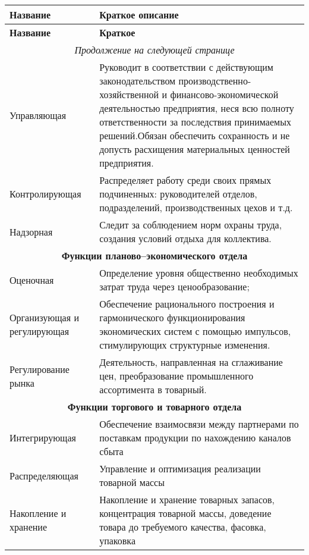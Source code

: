 \documentclass[a4paper,14pt]{extarticle}
\begin{document}
\begin{longtable}[h!]{|p{0.3\linewidth}|p{0.7\linewidth}|}
	\hline
	\textbf{Название} & \textbf{Краткое описание} \\
	\hline
	\endfirsthead
	\hline
	\textbf{Название} & \textbf{Краткое} \\
	\hline \endhead
	\hline
	\multicolumn{2}{c}{\textit{Продолжение на следующей странице}}
	\endfoot
	\hline \endlastfoot
	\hline
	\multicolumn{2}{|c|}{\textbf{Функции директора оптового предприятия}} \\ \hline
	Управляющая & Руководит в соответствии с действующим законодательством производственно-хозяйственной и финансово-экономической деятельностью предприятия, неся всю полноту ответственности за последствия принимаемых решений.Обязан обеспечить сохранность и не допусть расхищения материальных ценностей предприятия. \\ \hline
	Контролирующая & Распределяет работу среди своих прямых подчиненных: руководителей отделов, подразделений, производственных цехов и т.д.\\ \hline
	Надзорная & Следит за соблюдением норм охраны труда, создания условий отдыха для коллектива.\\ \hline
	
	\multicolumn{2}{|c|}{\textbf{Функции планово--экономического отдела}} \\ \hline
	Оценочная     & Определение уровня общественно необходимых затрат труда
	через ценообразование;\\ \hline
	Организующая и
	регулирующая  & Обеспечение рационального построения и гармонического функционирования
	экономических систем с помощью
	импульсов, стимулирующих структурные изменения.\\ \hline
	{Регулирование рынка} & Деятельность, направленная на сглаживание цен,
	преобразование промышленного ассортимента в товарный. \\\hline
	
	\multicolumn{2}{|c|}{\textbf{Функции торгового и товарного отдела}} \\ \hline
	Интегрирующая & Обеспечение взаимосвязи между партнерами по поставкам продукции
	по нахождению каналов сбыта\\ \hline
	Распределяющая & Управление и оптимизация реализации товарной массы\\ \hline
	Накопление и хранение & Накопление и хранение товарных запасов, концентрация товарной массы,
	доведение товара до требуемого качества, фасовка, упаковка\\ \hline
	

\end{longtable}
\end{document}
